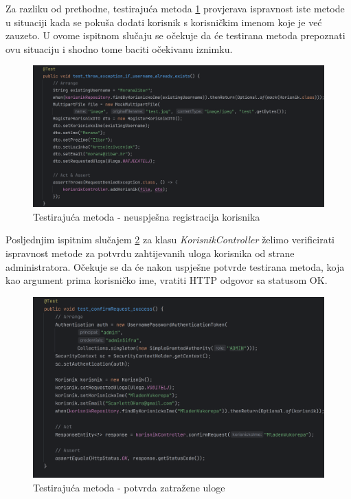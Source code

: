 Za razliku od prethodne, testirajuća metoda \ref{fig:test2} provjerava ispravnost iste metode u situaciji kada se pokuša dodati korisnik s korisničkim imenom koje je već zauzeto.  U ovome ispitnom slučaju se očekuje da će testirana metoda prepoznati ovu situaciju i shodno tome baciti očekivanu iznimku.

\begin{figure}[H]
	\includegraphics[scale=0.15]{slike/test2.png}
	\centering
	\caption{Testirajuća metoda - neuspješna registracija korisnika}
	\label{fig:test2}
\end{figure}

Posljednjim ispitnim slučajem \ref{fig:test3} za klasu \textit{KorisnikController} želimo verificirati  ispravnost metode za potvrdu zahtijevanih uloga korisnika od strane administratora. Očekuje se da će nakon uspješne potvrde testirana metoda, koja kao argument prima korisničko ime, vratiti HTTP odgovor sa statusom OK.

\begin{figure}[H]
	\includegraphics[scale=0.15]{slike/test3.png}
	\centering
	\caption{Testirajuća metoda - potvrda zatražene uloge}
	\label{fig:test3}
\end{figure}

